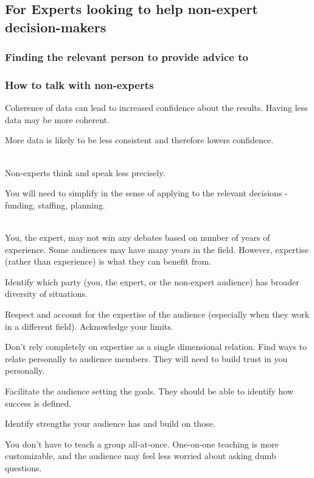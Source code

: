 \subsection*{For Experts looking to help non-expert decision-makers}


\subsubsection*{Finding the relevant person to provide advice to}



\subsubsection*{How to talk with non-experts}

Coherence of data can lead to increased confidence about the results.
Having less data may be more coherent. 

More data is likely to be less consistent and therefore lowers confidence.

\ \\

Non-experts think and speak less precisely.

You will need to simplify in the sense of applying to the relevant decisions - funding, staffing, planning.

\ \\

You, the expert, may not win any debates based on number of years of experience. Some audiences may have many years in the field. However, expertise (rather than experience) is what they can benefit from. 

Identify which party (you, the expert, or the non-expert audience) has broader diversity of situations.

Respect and account for the expertise of the audience (especially when they work in a different field). Acknowledge your  limits.

Don't rely completely on expertise as a single dimensional relation. Find ways to relate personally to audience members. They will need to build trust in you personally.

Facilitate the audience setting the goals. They should be able to identify how success is defined.

Identify strengths your audience has and build on those.

You don't have to teach a group all-at-once. One-on-one teaching is more customizable, and the audience may feel less worried about asking dumb questions.

